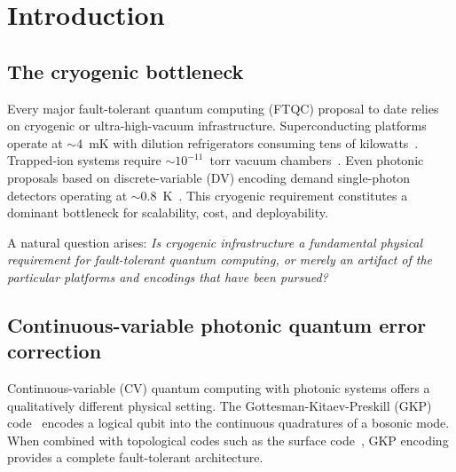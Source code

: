 \documentclass[twocolumn,showpacs,preprintnumbers,amsmath,amssymb,superscriptaddress]{revtex4-2}
\begin{document}
\maketitle

\section{Introduction}
\label{sec:intro}

\subsection{The cryogenic bottleneck}

Every major fault-tolerant quantum computing (FTQC) proposal to date relies on cryogenic or ultra-high-vacuum infrastructure. Superconducting platforms operate at $\sim 4$~mK with dilution refrigerators consuming tens of kilowatts~\cite{arute2019,google2023}. Trapped-ion systems require $\sim 10^{-11}$~torr vacuum chambers~\cite{bruzewicz2019}. Even photonic proposals based on discrete-variable (DV) encoding demand single-photon detectors operating at $\sim 0.8$~K~\cite{silverstone2016,bourassa2021}. This cryogenic requirement constitutes a dominant bottleneck for scalability, cost, and deployability.

A natural question arises: \emph{Is cryogenic infrastructure a fundamental physical requirement for fault-tolerant quantum computing, or merely an artifact of the particular platforms and encodings that have been pursued?}

\subsection{Continuous-variable photonic quantum error correction}

Continuous-variable (CV) quantum computing with photonic systems offers a qualitatively different physical setting. The Gottesman-Kitaev-Preskill (GKP) code~\cite{gkp2001} encodes a logical qubit into the continuous quadratures of a bosonic mode. When combined with topological codes such as the surface code~\cite{noh2022,fukui2018}, GKP encoding provides a complete fault-tolerant architecture.
\end{document}

